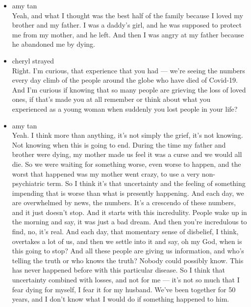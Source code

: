 \begin{itemize}
\item
  amy tan\\
  Yeah, and what I thought was the best half of the family because I
  loved my brother and my father. I was a daddy's girl, and he was
  supposed to protect me from my mother, and he left. And then I was
  angry at my father because he abandoned me by dying.
\item
  cheryl strayed\\
  Right. I'm curious, that experience that you had --- we're seeing the
  numbers every day climb of the people around the globe who have died
  of Covid-19. And I'm curious if knowing that so many people are
  grieving the loss of loved ones, if that's made you at all remember or
  think about what you experienced as a young woman when suddenly you
  lost people in your life?
\item
  amy tan\\
  Yeah. I think more than anything, it's not simply the grief, it's not
  knowing. Not knowing when this is going to end. During the time my
  father and brother were dying, my mother made us feel it was a curse
  and we would all die. So we were waiting for something worse, even
  worse to happen, and the worst that happened was my mother went crazy,
  to use a very non-psychiatric term. So I think it's that uncertainty
  and the feeling of something impending that is worse than what is
  presently happening. And each day, we are overwhelmed by news, the
  numbers. It's a crescendo of these numbers, and it just doesn't stop.
  And it starts with this incredulity. People wake up in the morning and
  say, it was just a bad dream. And then you're incredulous to find, no,
  it's real. And each day, that momentary sense of disbelief, I think,
  overtakes a lot of us, and then we settle into it and say, oh my God,
  when is this going to stop? And all these people are giving us
  information, and who's telling the truth or who knows the truth?
  Nobody could possibly know. This has never happened before with this
  particular disease. So I think that uncertainty combined with losses,
  and not for me --- it's not so much that I fear dying for myself, I
  fear it for my husband. We've been together for 50 years, and I don't
  know what I would do if something happened to him.


\end{itemize}
